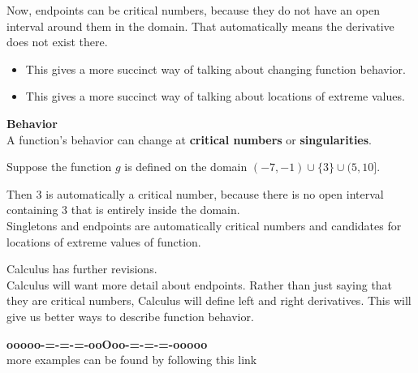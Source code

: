 \documentclass{ximera}
\begin{document}
Now, endpoints can be critical numbers, because they do not have an open interval around them in the domain.  That automatically means the derivative does not exist there. \\






\begin{itemize}
\item This gives a more succinct way of talking about changing function behavior. 
\item This gives a more succinct way of talking about locations of extreme values. 
\end{itemize}




\begin{idea} \textbf{\textcolor{green!50!black}{Behavior}} \\


A function's behavior can change at \textbf{critical numbers} or \textbf{singularities}.






\end{idea}


\begin{example}


Suppose the function $g$ is defined on the domain $(-7, -1) \cup \{ 3 \} \cup (5, 10]$.

Then $3$ is automatically a critical number, because there is no open interval containing $3$ that is entirely inside the domain.\\


Singletons and endpoints are automatically critical numbers and candidates for locations of extreme values of function.


\end{example}



Calculus has further revisions.\\


Calculus will want more detail about endpoints.  Rather than just saying that they are critical numbers, Calculus will define left and right derivatives.  This will give us better ways to describe function behavior. \\













\begin{center}
\textbf{\textcolor{green!50!black}{ooooo-=-=-=-ooOoo-=-=-=-ooooo}} \\

more examples can be found by following this link\\ 

\end{center}
\end{document}
